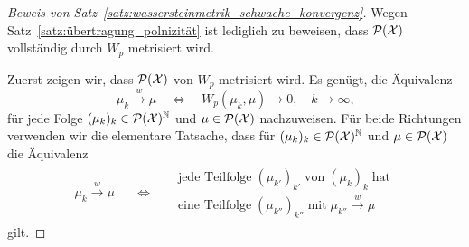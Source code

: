 \documentclass[../thesis/thesis.tex]{subfiles}
\begin{document}
	\begin{proof}[Beweis von Satz~\ref{satz:wassersteinmetrik_schwache_konvergenz}]
		Wegen Satz~\ref{satz:übertragung_polnizität} ist lediglich zu beweisen, dass $\mathcal{P}(\mathcal{X})$ vollständig durch $W_p$ metrisiert wird. 
		
		Zuerst zeigen wir, dass $\mathcal{P}(\mathcal{X})$ von $W_p$ metrisiert wird. Es genügt, die Äquivalenz
		\[ \mu_k \xrightarrow{w} \mu \quad \iff \quad W_p(\mu_k, \mu) \to 0, \quad k \to \infty \text{,} \]
		für jede Folge $(\mu_k)_k \in \mathcal{P}(\mathcal{X})^{\mathbb{N}}$ und $\mu \in \mathcal{P}(\mathcal{X})$ nachzuweisen.
		Für beide Richtungen verwenden wir die elementare Tatsache, dass für $(\mu_k)_k \in \mathcal{P}(\mathcal{X})^{\mathbb{N}}$ und $\mu \in \mathcal{P}(\mathcal{X})$ die Äquivalenz
		\[ \begin{matrix}
			\mu_k \xrightarrow{w} \mu \quad & \iff & \quad \begin{array}{lr}
				\text{jede Teilfolge} \; (\mu_{k'})_{k'} \; \text{von} \; (\mu_k)_k \; \text{hat} \\
				\text{eine Teilfolge} \; (\mu_{k''})_{k''} \; \text{mit} \; \mu_{k''} \xrightarrow{w} \mu
			\end{array} \label{glg:6.1} \tag{6.1}
		\end{matrix} \]
		gilt.
		

\end{proof}
\end{document}
